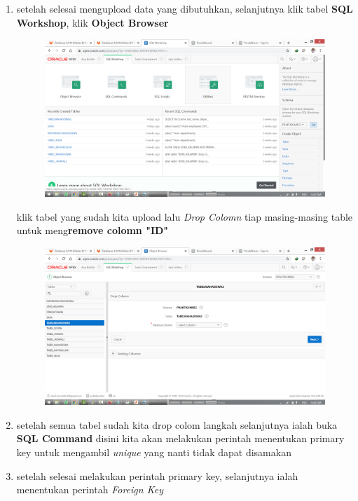 \documentclass[11pt]{article}
\begin{document}
\begin{enumerate}
\item
setelah selesai mengupload data yang dibutuhkan, selanjutnya klik tabel \textbf{SQL Workshop}, klik \textbf{Object Browser}
	\begin{figure}[h]
        \centerline{\includegraphics[scale=0.1]{img/b1.png}}
        \centering
        \caption{}
		\label{langkah23}
	\end{figure}
	
\newpage
klik tabel yang sudah kita upload lalu \textit{Drop Colomn} tiap masing-masing table untuk meng\textbf{remove colomn "ID"}
	\begin{figure}[h]
        \centerline{\includegraphics[scale=0.1]{img/b2.png}}
        \centering
        \caption{}
		\label{langkah24}
	\end{figure}
	
\item
setelah semua tabel sudah kita drop colom langkah selanjutnya ialah buka \textbf{SQL Command} disini kita akan melakukan perintah menentukan primary key untuk mengambil \textit{unique} yang nanti tidak dapat disamakan

\item
setelah  selesai melakukan perintah primary key, selanjutnya ialah menentukan perintah \textit{Foreign Key} 


\end{enumerate}
\end{document}
